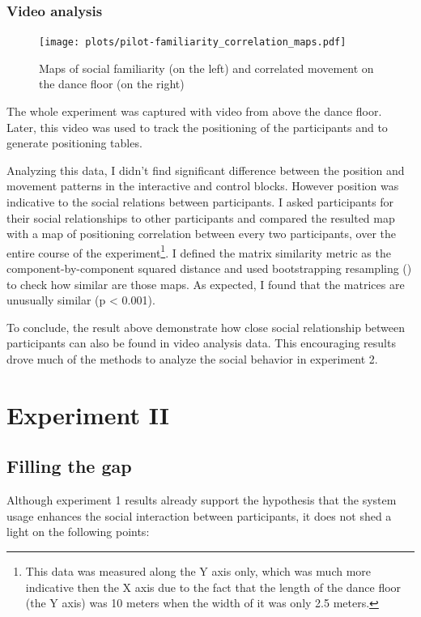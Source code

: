\documentclass[a4paper,11pt]{article}
\begin{document}
{\subsubsection{Video analysis}\label{exp1:results:video}

\begin{figure}[!htb]
    \centering
    \texttt{[image: plots/pilot-familiarity\_correlation\_maps.pdf]}
    \caption{Maps of social familiarity (on the left) and correlated movement on the dance floor (on the right)}\label{plot:pilot-familiarity_correlation_maps}
\end{figure}

The whole experiment was captured with video from above the dance floor.
Later, this video was used to track the positioning of the participants and to generate positioning tables.

Analyzing this data, I didn't find significant difference between the position and movement patterns in the interactive and control blocks.
However position was indicative to the social relations between participants.
I asked participants for their social relationships to other participants and compared the resulted map with a map of positioning correlation between every two participants, over the entire course of the experiment\footnote{This data was measured along the Y axis only, which was much more indicative then the X axis due to the fact that the length of the dance floor (the Y axis) was 10 meters when the width of it was only 2.5 meters.}.
I defined the matrix similarity metric as the component-by-component squared distance and used bootstrapping resampling (\cite{good2006permutation}) to check how similar are those maps.
As expected, I found that the matrices are unusually similar (p \textless{} 0.001).

To conclude, the result above demonstrate how close social relationship between participants can also be found in video analysis data.
This encouraging results drove much of the methods to analyze the social behavior in experiment 2.

\section{Experiment II}

\subsection{Filling the gap}

Although experiment 1 results already support the hypothesis that the system usage enhances the social interaction between participants, it does not shed a light on the following points:

}
\end{document}
